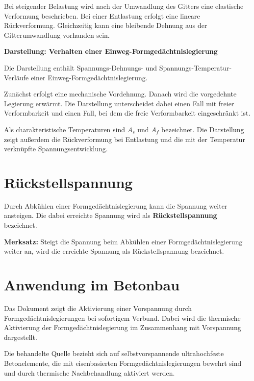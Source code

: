 \documentclass[
  12pt,
  a4paper,
  oneside
]{scrreprt}
\begin{document}
Bei steigender Belastung wird nach der Umwandlung des Gitters eine
elastische Verformung beschrieben. Bei einer Entlastung erfolgt eine
lineare Rückverformung. Gleichzeitig kann eine bleibende Dehnung aus
der Gitterumwandlung vorhanden sein. 

\begin{darstellungsbox}
\textbf{Darstellung: Verhalten einer Einweg-Formgedächtnislegierung}

Die Darstellung enthält Spannungs-Dehnungs- und
Spannungs-Temperatur-Verläufe einer Einweg-Formgedächtnislegierung.

Zunächst erfolgt eine mechanische Vordehnung. Danach wird die
vorgedehnte Legierung erwärmt. Die Darstellung unterscheidet dabei
einen Fall mit freier Verformbarkeit und einen Fall, bei dem die freie
Verformbarkeit eingeschränkt ist.

Als charakteristische Temperaturen sind $A_s$ und $A_f$ bezeichnet.
Die Darstellung zeigt außerdem die Rückverformung bei Entlastung und
die mit der Temperatur verknüpfte Spannungsentwicklung.
\end{darstellungsbox}

\section{Rückstellspannung}

Durch Abkühlen einer Formgedächtnislegierung kann die Spannung weiter
ansteigen. Die dabei erreichte Spannung wird als
\textbf{Rückstellspannung} bezeichnet. 

\begin{merksatzbox}
\textbf{Merksatz:}
Steigt die Spannung beim Abkühlen einer Formgedächtnislegierung weiter
an, wird die erreichte Spannung als Rückstellspannung bezeichnet.

\end{merksatzbox}

\section{Anwendung im Betonbau}

Das Dokument zeigt die Aktivierung einer Vorspannung durch
Formgedächtnislegierungen bei sofortigem Verbund. Dabei wird die
thermische Aktivierung der Formgedächtnislegierung im Zusammenhang mit
Vorspannung dargestellt. 

Die behandelte Quelle bezieht sich auf selbstvorspannende
ultrahochfeste Betonelemente, die mit eisenbasierten
Formgedächtnislegierungen bewehrt sind und durch thermische
Nachbehandlung aktiviert werden. 
\end{document}
